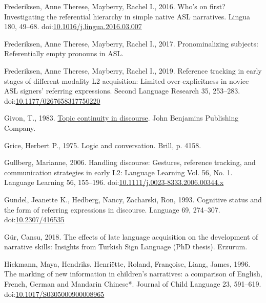 \documentclass[]{elsarticle} %
\newlength{\cslhangindent}
\newenvironment{CSLReferences}[2] %
 {%
  \setlength{\parindent}{0pt}
  \ifodd #1 \everypar{\setlength{\hangindent}{\cslhangindent}}\ignorespaces\fi
  \ifnum #2 > 0
  \setlength{\parskip}{#2\baselineskip}
  \fi
 }%
 {}
\begin{document}
\begin{CSLReferences}{1}{0}
\leavevmode{}%
Frederiksen, Anne Therese, Mayberry, Rachel I., 2016. Who's on first?
Investigating the referential hierarchy in simple native ASL narratives.
Lingua 180, 49--68.
doi:\href{https://doi.org/10.1016/j.lingua.2016.03.007}{10.1016/j.lingua.2016.03.007}

\leavevmode{}%
Frederiksen, Anne Therese, Mayberry, Rachel I., 2017. Pronominalizing
subjects: Referentially empty pronouns in ASL.

\leavevmode{}%
Frederiksen, Anne Therese, Mayberry, Rachel I., 2019. Reference tracking
in early stages of different modality L2 acquisition: Limited
over-explicitness in novice ASL signers{'} referring expressions. Second
Language Research 35, 253--283.
doi:\href{https://doi.org/10.1177/0267658317750220}{10.1177/0267658317750220}

\leavevmode{}%
Givon, T., 1983. \href{https://benjamins.com/catalog/tsl.3}{Topic
continuity in discourse}. John Benjamins Publishing Company.

\leavevmode{}%
Grice, Herbert P., 1975. Logic and conversation. Brill, p. 4158.

\leavevmode{}%
Gullberg, Marianne, 2006. Handling discourse: Gestures, reference
tracking, and communication strategies in early L2: Language Learning
Vol. 56, No. 1. Language Learning 56, 155--196.
doi:\href{https://doi.org/10.1111/j.0023-8333.2006.00344.x}{10.1111/j.0023-8333.2006.00344.x}

\leavevmode{}%
Gundel, Jeanette K., Hedberg, Nancy, Zacharski, Ron, 1993. Cognitive
status and the form of referring expressions in discourse. Language 69,
274--307. doi:\href{https://doi.org/10.2307/416535}{10.2307/416535}

\leavevmode{}%
Gür, Cansu, 2018. The effects of late language acquisition on the
development of narrative skills: Insights from Turkish Sign Language
(PhD thesis). Erzurum.

\leavevmode{}%
Hickmann, Maya, Hendriks, Henriëtte, Roland, Françoise, Liang, James,
1996. The marking of new information in children's narratives: a
comparison of English, French, German and Mandarin Chinese*. Journal of
Child Language 23, 591--619.
doi:\href{https://doi.org/10.1017/S0305000900008965}{10.1017/S0305000900008965}


\end{CSLReferences}
\end{document}
